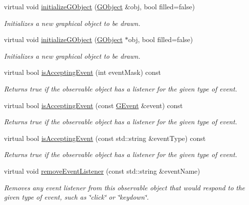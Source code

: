 \begin{DoxyCompactItemize}
virtual void \mbox{\hyperlink{classsgl_1_1GDrawingSurface_a814498efebc5586645159cd22990cf61}{initialize\+G\+Object}} (\mbox{\hyperlink{classsgl_1_1GObject}{G\+Object}} \&obj, bool filled=false)
\begin{DoxyCompactList}\small\item\em Initializes a new graphical object to be drawn. \end{DoxyCompactList}\item 
virtual void \mbox{\hyperlink{classsgl_1_1GDrawingSurface_a43e6bc951980da061ddc40407daee227}{initialize\+G\+Object}} (\mbox{\hyperlink{classsgl_1_1GObject}{G\+Object}} $\ast$obj, bool filled=false)
\begin{DoxyCompactList}\small\item\em Initializes a new graphical object to be drawn. \end{DoxyCompactList}\item 
virtual bool \mbox{\hyperlink{classsgl_1_1GObservable_aeec1adc19aa0f33de62390686ee1382c}{is\+Accepting\+Event}} (int event\+Mask) const
\begin{DoxyCompactList}\small\item\em Returns true if the observable object has a listener for the given type of event. \end{DoxyCompactList}\item 
virtual bool \mbox{\hyperlink{classsgl_1_1GObservable_aa31c73145a29dcb92848a92e0cfaea41}{is\+Accepting\+Event}} (const \mbox{\hyperlink{classsgl_1_1GEvent}{G\+Event}} \&event) const
\begin{DoxyCompactList}\small\item\em Returns true if the observable object has a listener for the given type of event. \end{DoxyCompactList}\item 
virtual bool \mbox{\hyperlink{classsgl_1_1GObservable_a3b1c689267eda44e65a2213e7de38b23}{is\+Accepting\+Event}} (const std\+::string \&event\+Type) const
\begin{DoxyCompactList}\small\item\em Returns true if the observable object has a listener for the given type of event. \end{DoxyCompactList}\item 
virtual void \mbox{\hyperlink{classsgl_1_1GObservable_acbcf1ed3a851ad8a3c17ef38d86b481d}{remove\+Event\+Listener}} (const std\+::string \&event\+Name)
\begin{DoxyCompactList}\small\item\em Removes any event listener from this observable object that would respond to the given type of event, such as \char`\"{}click\char`\"{} or \char`\"{}keydown\char`\"{}. \end{DoxyCompactList}\item 

\end{DoxyCompactItemize}
